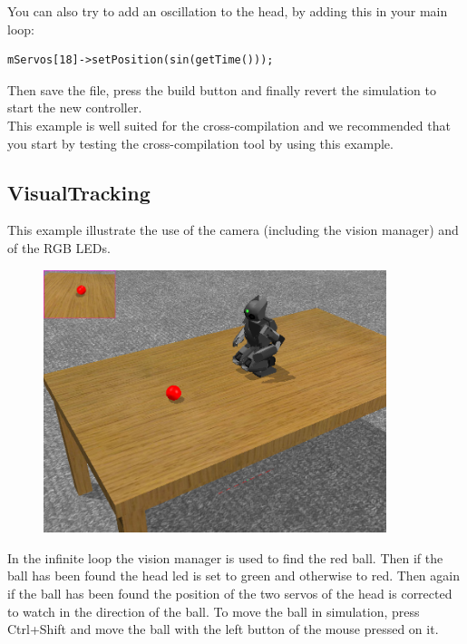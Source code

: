 \documentclass[a4paper, 12pt]{article}  		%
\begin{document}
You can also try to add an oscillation to the head, by adding this in your main loop:
\lstset{language=c++} 
\lstset{commentstyle=\textit} 
\begin{lstlisting} 
mServos[18]->setPosition(sin(getTime()));
\end{lstlisting}

Then save the file, press the build button and finally revert the simulation to start the new controller.\\

This example is well suited for the cross-compilation and we recommended that you start by testing the cross-compilation tool by using this example.\\

\newpage
\subsection{VisualTracking}

This example illustrate the use of the camera (including the vision manager) and of the RGB LEDs.\\

\begin{figure}[H]
\begin{center}
\includegraphics[width=10cm]{example_visualTracking.png}
\label{example_visualTracking.png}
\end{center}
\end{figure}

In the infinite loop the vision manager is used to find the red ball. 
Then if the ball has been found the head led is set to green and otherwise to red.
Then again if the ball has been found the position of the two servos of the head is corrected to watch in the direction of the ball. To move the ball in simulation, press Ctrl+Shift and move the ball with the left button of the mouse pressed on it.\\
\end{document}
